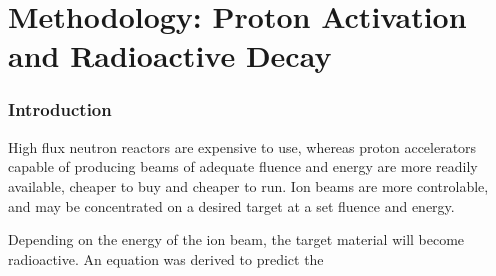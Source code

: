 \chapter{Methodology: Proton Activation and Radioactive Decay}

\begin{changemargin}{1.0cm}{1.0cm}
\end{changemargin}



\subsection{Introduction}


High flux neutron reactors are expensive to use, whereas proton accelerators capable of producing beams of adequate fluence and energy are more readily available, cheaper to buy and cheaper to run.  Ion beams are more controlable, and may be concentrated on a desired target at a set fluence and energy.

Depending on the energy of the ion beam, the target material will become radioactive.  An equation was derived to predict the 

